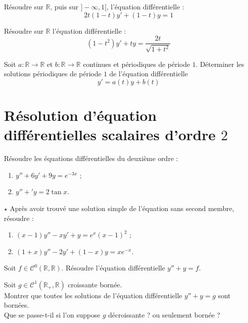 \documentclass[french,a4paper]{article}
\newcommand{\R}{\mathbb{R}}
\theoremstyle{plain}
\theoremstyle{definition}
\theoremstyle{remark}
\begin{document}
\begin{ex}[Moulin.ED.07]{}
	Résoudre sur $\R$, puis sur $]-\infty,1[$, l'équation différentielle : $$2t(1-t)y'+(1-t)y=1$$
\end{ex}

\begin{ex}[Moulin.ED.08]{}
	Résoudre sur $\R$ l'équation différentielle : $$(1-t^2)y'+ty=\frac{2t}{\sqrt{1+t^2}}$$
\end{ex}

\begin{ex}[Moulin.ED.09]{}
	Soit $a:\R\to\R$ et $b:\R\to\R$ continues et périodiques de période $1$. Déterminer les solutions périodiques de période $1$ de l'équation différentielle $$y'=a(t)y+b(t)$$
\end{ex}

\section{Résolution d'équation différentielles scalaires d'ordre $2$}

\begin{ex}[Moulin.ED.10]{}
	Résoudre les équations différentielles du deuxième ordre :
	\begin{enumerate}
		\item $y''+6y'+9y=e^{-3x}$ ;
		\item $y''+'y=2\tan x$.
	\end{enumerate}
\end{ex}

\begin{ex}[Moulin.ED.11]{$\star$}
	Après avoir trouvé une solution simple de l'équation sans second membre, résoudre :
	\begin{enumerate}
		\item $(x-1)y''-xy'+y=e^{x}(x-1)^2$ ;
		\item $(1+x)y''-2y'+(1-x)y=xe^{-x}$.
	\end{enumerate}
\end{ex}

\begin{ex}[Moulin.ED.12]{}
	Soit $f\in\mathcal{C}^0(\R,\R)$. Résoudre l'équation différentielle $y''+y=f$.
\end{ex}

\begin{ex}[Moulin.ED.13]{}
	Soit $g\in\mathcal{C}^1(\R_+,\R)$ croissante bornée. \\
	Montrer que toutes les solutions de l'équation différentielle $y''+y=g$ sont bornées. \\
	Que se passe-t-il si l'on suppose $g$ décroissante ? ou seulement bornée ?
\end{ex}
\end{document}
